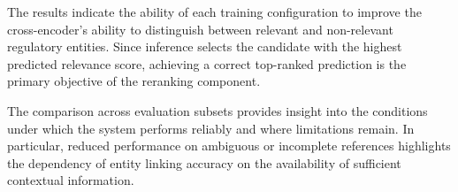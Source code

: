 The results indicate the ability of each training configuration to improve the cross-encoder's ability to distinguish between relevant and non-relevant regulatory entities. Since inference selects the candidate with the highest predicted relevance score, achieving a correct top-ranked prediction is the primary objective of the reranking component.

The comparison across evaluation subsets provides insight into the conditions under which the system performs reliably and where limitations remain. In particular, reduced performance on ambiguous or incomplete references highlights the dependency of entity linking accuracy on the availability of sufficient contextual information.